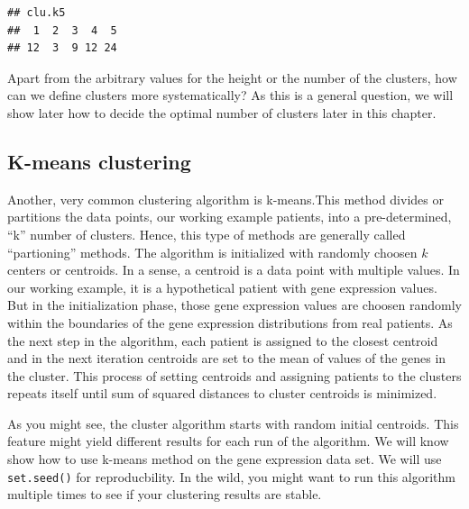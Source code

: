 \documentclass[12pt,]{krantz}
\newenvironment{Shaded}{\begin{snugshade}}{\end{snugshade}}
\newcommand{\CommentTok}[1]{\textcolor[rgb]{0.56,0.35,0.01}{\textit{#1}}}
\newcommand{\DataTypeTok}[1]{\textcolor[rgb]{0.13,0.29,0.53}{#1}}
\newcommand{\DecValTok}[1]{\textcolor[rgb]{0.00,0.00,0.81}{#1}}
\newcommand{\KeywordTok}[1]{\textcolor[rgb]{0.13,0.29,0.53}{\textbf{#1}}}
\newcommand{\NormalTok}[1]{#1}
\newcommand{\OperatorTok}[1]{\textcolor[rgb]{0.81,0.36,0.00}{\textbf{#1}}}
\theoremstyle{definition}
\theoremstyle{definition}
\theoremstyle{definition}
\theoremstyle{remark}
\begin{document}
\begin{verbatim}
## clu.k5
##  1  2  3  4  5 
## 12  3  9 12 24
\end{verbatim}

Apart from the arbitrary values for the height or the number of the
clusters, how can we define clusters more systematically? As this is a
general question, we will show later how to decide the optimal number of
clusters later in this chapter.

\hypertarget{k-means-clustering}{%
\subsection{K-means clustering}\label{k-means-clustering}}

Another, very common clustering algorithm is k-means.This method divides
or partitions the data points, our working example patients, into a
pre-determined, ``k'' number of clusters. Hence, this type of methods
are generally called ``partioning'' methods. The algorithm is
initialized with randomly choosen \(k\) centers or centroids. In a
sense, a centroid is a data point with multiple values. In our working
example, it is a hypothetical patient with gene expression values. But
in the initialization phase, those gene expression values are choosen
randomly within the boundaries of the gene expression distributions from
real patients. As the next step in the algorithm, each patient is
assigned to the closest centroid and in the next iteration centroids are
set to the mean of values of the genes in the cluster. This process of
setting centroids and assigning patients to the clusters repeats itself
until sum of squared distances to cluster centroids is minimized.

As you might see, the cluster algorithm starts with random initial
centroids. This feature might yield different results for each run of
the algorithm. We will know show how to use k-means method on the gene
expression data set. We will use \texttt{set.seed()} for reproducbility.
In the wild, you might want to run this algorithm multiple times to see
if your clustering results are stable.

\begin{Shaded}
\end{Shaded}
\end{document}
